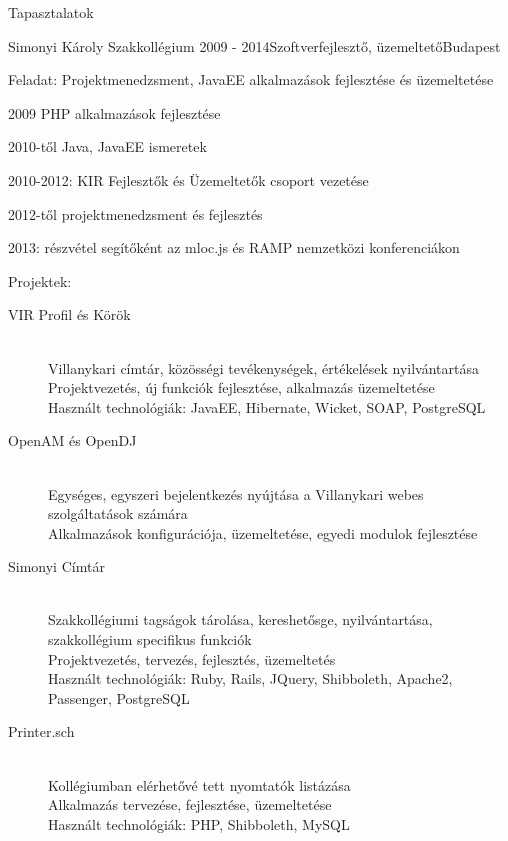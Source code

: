 \documentclass{resume} %
\begin{document}
\begin{rSection}{Tapasztalatok}

\begin{rSubsection}{Simonyi Károly Szakkollégium}
{2009 - 2014}{Szoftverfejlesztő, üzemeltető}{Budapest}
\item Feladat: Projektmenedzsment, JavaEE alkalmazások fejlesztése és üzemeltetése
\item 2009 PHP alkalmazások fejlesztése
\item 2010-től Java, JavaEE ismeretek
\item 2010-2012: KIR Fejlesztők és Üzemeltetők csoport vezetése
\item 2012-től projektmenedzsment és fejlesztés
\item 2013: részvétel segítőként az mloc.js és RAMP nemzetközi konferenciákon
\item Projektek:
	\begin{description}
		\item[VIR Profil és Körök] \hfill \\
		Villanykari címtár, közösségi tevékenységek, értékelések nyilvántartása \\
		Projektvezetés, új funkciók fejlesztése, alkalmazás üzemeltetése \\
		Használt technológiák: JavaEE, Hibernate, Wicket, SOAP, PostgreSQL
		\item[OpenAM és OpenDJ] \hfill \\
		Egységes, egyszeri bejelentkezés nyújtása a Villanykari webes szolgáltatások számára \\
		Alkalmazások konfigurációja, üzemeltetése, egyedi modulok fejlesztése
		\item[Simonyi Címtár] \hfill \\
		Szakkollégiumi tagságok tárolása, kereshetősge, nyilvántartása, szakkollégium specifikus funkciók \\
		Projektvezetés, tervezés, fejlesztés, üzemeltetés \\
		Használt technológiák: Ruby, Rails, JQuery, Shibboleth, Apache2, Passenger, PostgreSQL
		\item[Printer.sch] \hfill \\
		Kollégiumban elérhetővé tett nyomtatók listázása \\
		Alkalmazás tervezése, fejlesztése, üzemeltetése \\
		Használt technológiák: PHP, Shibboleth, MySQL
	\end{description}
\end{rSubsection}


\end{rSection}
\end{document}
